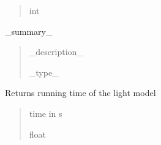 \documentclass[letterpaper,10pt,english]{sphinxmanual}
\begin{document}
\begin{fulllineitems}
\begin{fulllineitems}
\begin{quote}
\begin{description}
\sphinxAtStartPar
int

\end{description}\end{quote}

\end{fulllineitems}


\begin{fulllineitems}
\label{\detokenize{reference:LVM.LightVegeManager.tesselationtime}}
\pysigstartsignatures
{}
\pysigstopsignatures
\sphinxAtStartPar
\_summary\_
\begin{quote}\begin{description}
\sphinxAtStartPar
\_description\_

\sphinxAtStartPar
\_type\_

\end{description}\end{quote}

\end{fulllineitems}


\begin{fulllineitems}
\label{\detokenize{reference:LVM.LightVegeManager.modelruntime}}
\pysigstartsignatures
{}
\pysigstopsignatures
\sphinxAtStartPar
Returns running time of the light model
\begin{quote}\begin{description}
\sphinxAtStartPar
time in s

\sphinxAtStartPar
float

\end{description}\end{quote}

\end{fulllineitems}



\end{fulllineitems}
\end{document}
